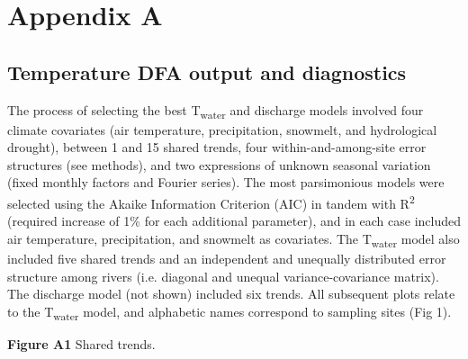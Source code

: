 \documentclass[notitlepage]{article}
\begin{document}
\section*{Appendix A}

\subsection*{Temperature DFA output and diagnostics}
The process of selecting the best T\textsubscript{water} and discharge models involved four climate covariates (air temperature, precipitation, snowmelt, and hydrological drought), between 1 and 15 shared trends, four within-and-among-site error structures (see methods), and two expressions of unknown seasonal variation (fixed monthly factors and Fourier series). The most parsimonious models were selected using the Akaike Information Criterion (AIC) in tandem with R\textsuperscript{2} (required increase of 1\% for each additional parameter), and in each case included air temperature, precipitation, and snowmelt as covariates. The T\textsubscript{water} model also included five shared trends and an independent and unequally distributed error structure among rivers (i.e. diagonal and unequal variance-covariance matrix). The discharge model (not shown) included six trends. All subsequent plots relate to the T\textsubscript{water} model, and alphabetic names correspond to sampling sites (Fig 1).

\begin{center}
\end{center}
\textbf{Figure A1} Shared trends.
\end{document}
